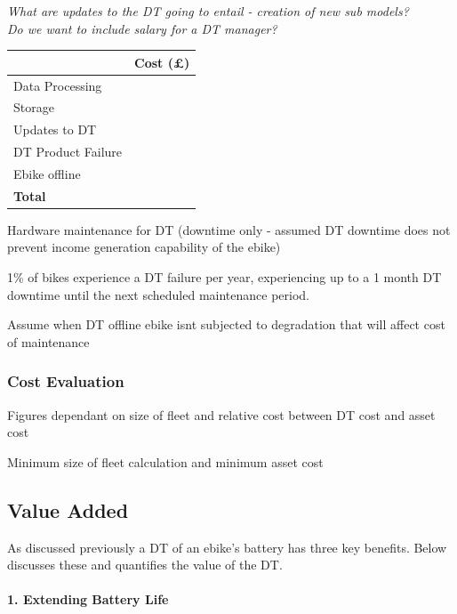 \documentclass[a4paper, 10pt]{article}
\numberwithin{equation}{section}
\begin{document}
\textit{What are updates to the DT going to entail - creation of new sub models?} \\

\textit{Do we want to include salary for a DT manager?}


\begin{table}[h]
\centering
\begin{tabular}{|l|l|}
\hline
                   & Cost (£) \\ \hline
Data Processing    &          \\ \hline
Storage            &          \\ \hline
Updates to DT      &          \\ \hline
DT Product Failure &          \\ \hline
Ebike offline      &          \\ \hline
\textbf{Total}     &          \\ \hline
\end{tabular}
\end{table}
\FloatBarrier

Hardware maintenance for DT (downtime only - assumed DT downtime does not prevent income generation capability of the ebike)

1\% of bikes experience a DT failure per year, experiencing up to a 1 month DT downtime until the next scheduled maintenance period.

Assume when DT offline ebike isnt subjected to degradation that will affect cost of maintenance

\subsubsection{Cost Evaluation}

Figures dependant on size of fleet and relative cost between DT cost and asset cost

Minimum size of fleet calculation and minimum asset cost

\subsection{Value Added}

As discussed previously a DT of an ebike's battery has three key benefits. Below discusses these and quantifies the value of the DT.
\\
\\
\textbf{1. Extending Battery Life}
\end{document}

